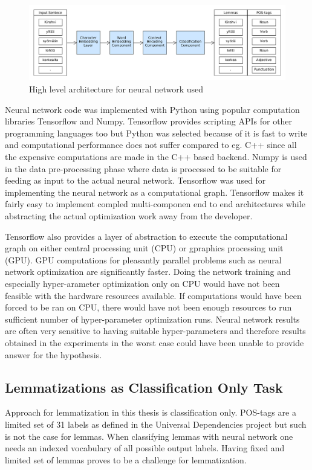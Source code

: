 \documentclass[12pt,a4paper,english
]{tutthesis}
\begin{document}
\begin{figure}[htbp]
\caption{High level architecture for neural network used}
\label{figure:architecture}
\centering
\includegraphics[width=15cm]{architecture.png}
\end{figure}

Neural network code was implemented with Python using popular computation libraries Tensorflow and Numpy. Tensorflow provides scripting APIs for other programming languages too but Python was selected because of it is fast to write and computational performance does not suffer compared to eg. C++ since all the expensive computations are made in the C++ based backend. Numpy is used in the data pre-processing phase where data is processed to be suitable for feeding as input to the actual neural network. Tensorflow was used for implementing the neural network as a computational graph. Tensorflow makes it fairly easy to implement compled multi-componen end to end architectures while abstracting the actual optimization work away from the developer.

Tensorflow also provides a layer of abstraction to execute the computational graph on either central processing unit (CPU) or gpraphics processing unit (GPU). GPU computations for pleasantly parallel problems such as neural network optimization are significantly faster. Doing the network training and especially hyper-arameter optimization only on CPU would have not been feasible with the hardware resources available. If computations would have been forced to be ran on CPU, there would have not been enough resources to run sufficient number of hyper-parameter optimization runs. Neural network results are often very sensitive to having suitable hyper-parameters and therefore results obtained in the experiments in the worst case could have been unable to provide answer for the hypothesis.

\subsection{Lemmatizations as Classification Only Task}
\label{ss:lemmatization_as_classification_only_task}
Approach for lemmatization in this thesis is classification only. POS-tags are a limited set of 31 labels as defined in the Universal Dependencies project but such is not the case for lemmas. When classifying lemmas with neural network one needs an indexed vocabulary of all possible output labels. Having fixed and limited set of lemmas proves to be a challenge for lemmatization.
\end{document}
